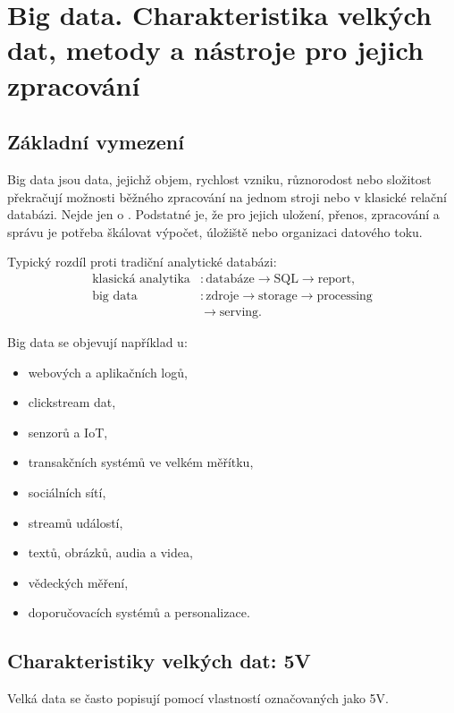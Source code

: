 \section{Big data. Charakteristika velkých dat, metody a nástroje pro jejich zpracování}

\subsection{Základní vymezení}

Big data jsou data, jejichž objem, rychlost vzniku, různorodost nebo složitost překračují možnosti
běžného zpracování na jednom stroji nebo v klasické relační databázi. Nejde jen o .
Podstatné je, že pro jejich uložení, přenos, zpracování a správu je potřeba škálovat výpočet,
úložiště nebo organizaci datového toku.

Typický rozdíl proti tradiční analytické databázi:
\[
\begin{aligned}
\text{klasická analytika}
&:
\text{databáze}
\rightarrow
\text{SQL}
\rightarrow
\text{report},\\
\text{big data}
&:
\text{zdroje}
\rightarrow
\text{storage}
\rightarrow
\text{processing}\\
&
\rightarrow
\text{serving}.
\end{aligned}
\]

Big data se objevují například u:
\begin{itemize}
    \item webových a aplikačních logů,
    \item clickstream dat,
    \item senzorů a IoT,
    \item transakčních systémů ve velkém měřítku,
    \item sociálních sítí,
    \item streamů událostí,
    \item textů, obrázků, audia a videa,
    \item vědeckých měření,
    \item doporučovacích systémů a personalizace.
\end{itemize}

\subsection{Charakteristiky velkých dat: 5V}

Velká data se často popisují pomocí vlastností označovaných jako 5V.

